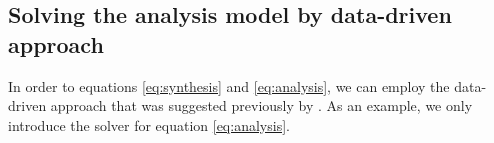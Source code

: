 \subsection{Solving the analysis model by data-driven approach}
In order to  equations \ref{eq:synthesis} and \ref{eq:analysis}, we can employ the data-driven approach that was suggested previously by \cite{jianfeng2013}. As an example, we only introduce the solver for equation \ref{eq:analysis}. %

